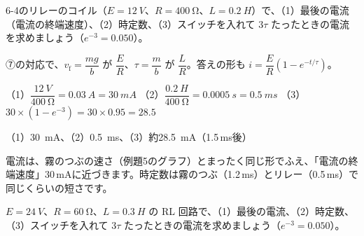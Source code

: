\begin{reidai}
6-4のリレーのコイル（$E=\qty{12}{V}$、$R=\qty{400}{\ohm}$、$L=\qty{0.2}{H}$）で、（1）最後の電流（電流の終端速度）、（2）時定数、（3）スイッチを入れて $3\tau$ たったときの電流を求めましょう（$e^{-3}=0.050$）。\par
\kangaekata ⑦の対応で、$v_{\mathrm f}=\dfrac{mg}{b}$ が $\dfrac{E}{R}$、$\tau=\dfrac{m}{b}$ が $\dfrac{L}{R}$。答えの形も $i=\dfrac{E}{R}(1-e^{-t/\tau})$。\par
\shiki（1）$\dfrac{\qty{12}{V}}{\qty{400}{\ohm}}=\qty{0.03}{A}=\qty{30}{mA}$\bkvifq
（2）$\dfrac{\qty{0.2}{H}}{\qty{400}{\ohm}}=\qty{0.0005}{s}=\qty{0.5}{ms}$\bkvifq
（3）$30\times(1-e^{-3})=30\times0.95=28.5$\par
\kotae（1）\qty{30}{mA}、（2）\qty{0.5}{ms}、（3）約\qty{28.5}{mA}（1.5\,ms後）
\end{reidai}
\noindent\begin{minipage}[c]{0.5\linewidth}
\end{minipage}\hfill
\begin{minipage}[c]{0.46\linewidth}\raggedright
電流は、霧のつぶの速さ（例題5のグラフ）とまったく同じ形でふえ、「電流の終端速度」30\,mAに近づきます。時定数は霧のつぶ（1.2\,ms）とリレー（0.5\,ms）で同じくらいの短さです。
\end{minipage}
\par\vspace{4pt}

\begin{jibun}
$E=\qty{24}{V}$、$R=\qty{60}{\ohm}$、$L=\qty{0.3}{H}$ の RL 回路で、（1）最後の電流、（2）時定数、（3）スイッチを入れて $3\tau$ たったときの電流を求めましょう（$e^{-3}=0.050$）。
\end{jibun}

